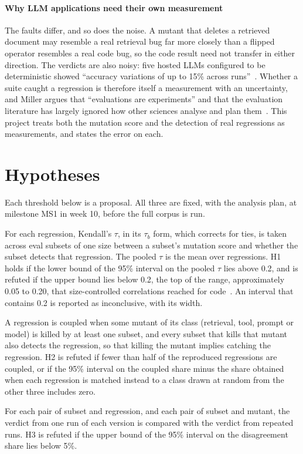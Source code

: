 \documentclass[11pt]{article}
\begin{document}
\paragraph{Why LLM applications need their own measurement} The faults differ, and so does the noise. A mutant that deletes a retrieved document may resemble a real retrieval bug far more closely than a flipped operator resembles a real code bug, so the code result need not transfer in either direction. The verdicts are also noisy: five hosted LLMs configured to be deterministic showed ``accuracy variations of up to 15\% across runs''~\cite{Atil2025}. Whether a suite caught a regression is therefore itself a measurement with an uncertainty, and Miller argues that ``evaluations are experiments'' and that the evaluation literature has largely ignored how other sciences analyse and plan them~\cite{Miller2024}. This project treats both the mutation score and the detection of real regressions as measurements, and states the error on each.

\section{Hypotheses}

Each threshold below is a proposal. All three are fixed, with the analysis plan, at milestone MS1 in week 10, before the full corpus is run.

\begin{claims}
  \item[\badgetarget{H1}]  For each regression, Kendall's $\tau$, in its $\tau_b$ form, which corrects for ties, is taken across eval subsets of one size between a subset's mutation score and whether the subset detects that regression. The pooled $\tau$ is the mean over regressions. H1 holds if the lower bound of the 95\% interval on the pooled $\tau$ lies above 0.2, and is refuted if the upper bound lies below 0.2, the top of the range, approximately 0.05 to 0.20, that size-controlled correlations reached for code~\cite{Papadakis2018}. An interval that contains 0.2 is reported as inconclusive, with its width.
  \item[\badgetarget{H2}]  A regression is coupled when some mutant of its class (retrieval, tool, prompt or model) is killed by at least one subset, and every subset that kills that mutant also detects the regression, so that killing the mutant implies catching the regression. H2 is refuted if fewer than half of the reproduced regressions are coupled, or if the 95\% interval on the coupled share minus the share obtained when each regression is matched instead to a class drawn at random from the other three includes zero.
  \item[\badgetarget{H3}]  For each pair of subset and regression, and each pair of subset and mutant, the verdict from one run of each version is compared with the verdict from repeated runs. H3 is refuted if the upper bound of the 95\% interval on the disagreement share lies below 5\%.
\end{claims}
\end{document}
